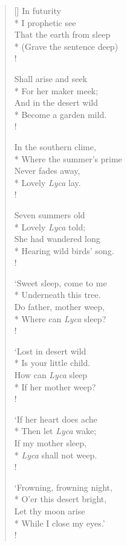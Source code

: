 \documentclass[MAIN]{subfiles}
\begin{document}
\settowidth{\versewidth}{That the earth from sleep}
\begin{verse}[\versewidth]
In futurity\\*
I prophetic see\\
That the earth from sleep\\*
(Grave the sentence deep)\\!

Shall arise and seek\\*
For her maker meek;\\
And in the desert wild\\*
Become a garden mild.\\!

In the southern clime,\\*
Where the summer's prime\\
Never fades away,\\*
Lovely \emph{Lyca} lay.\\!

Seven summers old\\*
Lovely \emph{Lyca} told;\\
She had wandered long\\*
Hearing wild birds' song.\\!

`Sweet sleep, come to me\\*
Underneath this tree.\\
Do father, mother weep,\\*
Where can \emph{Lyca} sleep?\\!

`Lost in desert wild\\*
Is your little child.\\
How can \emph{Lyca} sleep\\*
If her mother weep?\\!

`If her heart does ache\\*
Then let \emph{Lyca} wake;\\
If my mother sleep,\\*
\emph{Lyca} shall not weep.\\!

`Frowning, frowning night,\\*
O'er this desert bright,\\
Let thy moon arise\\*
While I close my eyes.'\\!


\end{verse}
\end{document}

